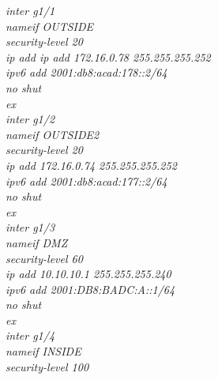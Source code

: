 \documentclass[a4paper, 12pt]{article}
\begin{document}
\hspace*{2cm}\textit{inter g1/1\\
\hspace*{2cm}nameif OUTSIDE\\
\hspace*{2cm}security-level 20\\
\hspace*{2cm}ip add ip add 172.16.0.78 255.255.255.252\\
\hspace*{2cm}ipv6 add 2001:db8:acad:178::2/64\\
\hspace*{2cm}no shut \\
\hspace*{2cm}ex\\
\hspace*{2cm}inter g1/2\\
\hspace*{2cm}nameif OUTSIDE2\\
\hspace*{2cm}security-level 20\\
\hspace*{2cm}ip add 172.16.0.74 255.255.255.252\\
\hspace*{2cm}ipv6 add 2001:db8:acad:177::2/64\\
\hspace*{2cm}no shut \\
\hspace*{2cm}ex\\
\hspace*{2cm}inter g1/3\\
\hspace*{2cm}nameif DMZ\\
\hspace*{2cm}security-level 60\\
\hspace*{2cm}ip add 10.10.10.1 255.255.255.240\\
\hspace*{2cm}ipv6 add 2001:DB8:BADC:A::1/64\\
\hspace*{2cm}no shut\\
\hspace*{2cm}ex\\
\hspace*{2cm}inter g1/4\\
\hspace*{2cm}nameif INSIDE\\
\hspace*{2cm}security-level 100\\
}
\end{document}
